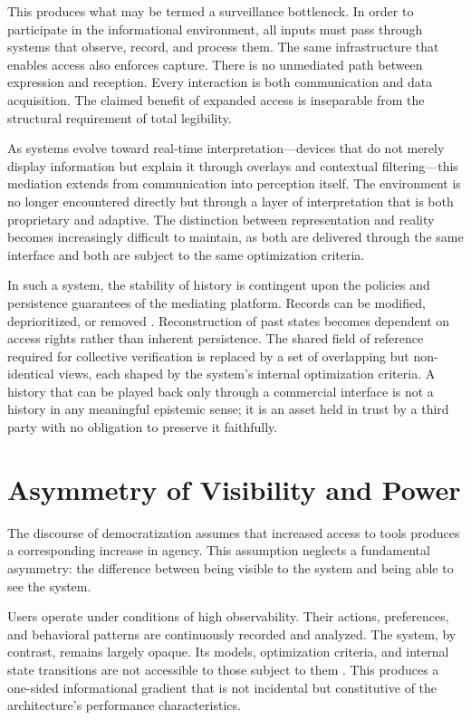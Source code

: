 \documentclass[12pt, a4paper]{article}
\begin{document}
This produces what may be termed a surveillance bottleneck. In order to participate in the informational environment, all inputs must pass through systems that observe, record, and process them. The same infrastructure that enables access also enforces capture. There is no unmediated path between expression and reception. Every interaction is both communication and data acquisition. The claimed benefit of expanded access is inseparable from the structural requirement of total legibility.

As systems evolve toward real-time interpretation---devices that do not merely display information but explain it through overlays and contextual filtering---this mediation extends from communication into perception itself. The environment is no longer encountered directly but through a layer of interpretation that is both proprietary and adaptive. The distinction between representation and reality becomes increasingly difficult to maintain, as both are delivered through the same interface and both are subject to the same optimization criteria.

In such a system, the stability of history is contingent upon the policies and persistence guarantees of the mediating platform. Records can be modified, deprioritized, or removed \cite{Wiener1948}. Reconstruction of past states becomes dependent on access rights rather than inherent persistence. The shared field of reference required for collective verification is replaced by a set of overlapping but non-identical views, each shaped by the system's internal optimization criteria. A history that can be played back only through a commercial interface is not a history in any meaningful epistemic sense; it is an asset held in trust by a third party with no obligation to preserve it faithfully.

\section{Asymmetry of Visibility and Power}

The discourse of democratization assumes that increased access to tools produces a corresponding increase in agency. This assumption neglects a fundamental asymmetry: the difference between being visible to the system and being able to see the system.

Users operate under conditions of high observability. Their actions, preferences, and behavioral patterns are continuously recorded and analyzed. The system, by contrast, remains largely opaque. Its models, optimization criteria, and internal state transitions are not accessible to those subject to them \cite{Zuboff2019}. This produces a one-sided informational gradient that is not incidental but constitutive of the architecture's performance characteristics.
\end{document}
